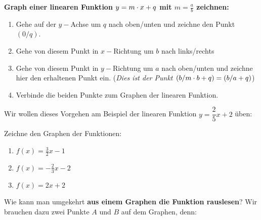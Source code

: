 \documentclass[11pt,oneside]{article}
\begin{document}
	\begin{framed}
		\textbf{Graph einer linearen Funktion $y=m\cdot x +q $ mit $m=\frac{a}{b}$ zeichnen:}
		\begin{enumerate}[label=(\Alph*)]
			\item Gehe auf der $y-$Achse um $q$ nach oben/unten und zeichne den Punkt $(0/q)$.
			\item Gehe von diesem Punkt in $x-$Richtung um $b$ nach links/rechts
			\item Gehe von diesem Punkt in $y-$Richtung um $a$ nach oben/unten und zeichne hier den erhaltenen Punkt ein. (\emph{Dies ist der Punkt $(b/m\cdot b+q)=(b/a+q)$})
			\item Verbinde die beiden Punkte zum Graphen der linearen Funktion.
		\end{enumerate}
	\end{framed}\newpage
	\begin{beispiel}
		Wir wollen dieses Vorgehen am Beispiel der linearen Funktion $y=\dfrac{2}{5}x+2$ üben:
		\vspace{5cm}
	\end{beispiel}
	\begin{aufgabe}
		Zeichne den Graphen der Funktionen:
		\begin{enumerate}[label=\alph*)]
			\item $f(x)=\frac{3}{2}x-1$
			\item $f(x)=-\frac{2}{3}x-2$
			\item $f(x)=2x+2$
		\end{enumerate}
	\end{aufgabe}
	\noindent\newpage
	Wie kann man umgekehrt \textbf{aus einem Graphen die Funktion rauslesen}? Wir brauchen dazu zwei Punkte $A$ und $B$ auf dem Graphen, denn:
\end{document}

